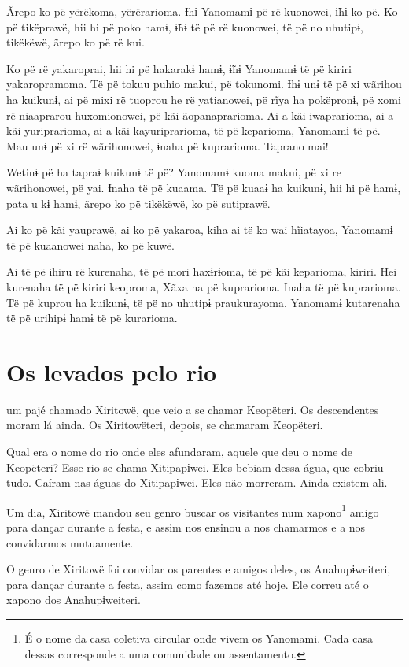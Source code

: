 Ãrepo ko pë yërëkoma, yërërarioma. Ɨhɨ Yanomamɨ pë rë kuonowei, ɨ̃hɨ ko
pë. Ko pë tikëprawë, hii hi pë poko hamɨ, ɨ̃hɨ të pë rë kuonowei, të pë
no uhutipɨ, tikëkëwë, ãrepo ko pë rë kui. 

Ko pë rë yakaroprai, hii hi pë hakarakɨ hamɨ, ɨ̃hɨ Yanomamɨ të pë kiriri
yakaropramoma. Të pë tokuu puhio makui, pë tokunomi. Ɨhɨ unɨ të pë xi
wãrihou ha kuikunɨ, ai pë mixi rë tuoprou he rë yatianowei, pë rĩya ha
pokëpronɨ, pë xomi rë niaaprarou huxomionowei, pë kãi ãopanaprarioma. Ai
a kãi iwaprarioma, ai a kãi yuriprarioma, ai a kãi kayuriprarioma, të pë
keparioma, Yanomamɨ të pë. Mau unɨ pë xi rë wãrihonowei, ɨnaha pë
kuprarioma. Taprano mai! 

Wetinɨ pë ha tapraɨ kuikunɨ të pë? Yanomamɨ kuoma makui, pë xi re
wãrihonowei, pë yai. Ɨnaha të pë kuaama. Të pë kuaaɨ ha kuikunɨ, hii hi
pë hamɨ, pata u kɨ hamɨ, ãrepo ko pë tikëkëwë, ko pë sutiprawë. 

Ai ko pë kãi yauprawë, ai ko pë yakaroa, kiha ai të ko wai hĩiatayoa,
Yanomamɨ të pë kuaanowei naha, ko pë kuwë. 

Ai të pë ihiru rë kurenaha, të pë mori haxɨrɨoma, të pë kãi keparioma,
kiriri. Hei kurenaha të pë kiriri keoproma, Xãxa na pë kuprarioma. Ɨnaha
të pë kuprarioma. Të pë kuprou ha kuikunɨ, të pë no uhutipɨ
praukurayoma. Yanomamɨ kutarenaha të pë urihipɨ hamɨ të pë kurarioma.

\chapter{Os levados pelo rio}

 um pajé chamado Xiritowë, que veio a se chamar Keopëteri. Os
descendentes moram lá ainda. Os Xiritowëteri, depois, se chamaram
Keopëteri. 

Qual era o nome do rio onde eles afundaram, aquele que deu o nome de
Keopëteri? Esse rio se chama Xitipapɨwei. Eles bebiam dessa água, que
cobriu tudo. Caíram nas águas do Xitipapɨwei. Eles não morreram. Ainda
existem ali. 

Um dia, Xiritowë mandou seu genro buscar os visitantes
num xapono\footnote{É o nome da casa coletiva circular onde vivem os Yanomami. Cada casa
dessas corresponde a uma comunidade ou assentamento.} amigo para dançar durante a festa, e assim
nos ensinou a nos chamarmos e a nos convidarmos mutuamente. 

O genro de Xiritowë foi convidar os parentes e amigos deles, os
Anahupɨweiteri, para dançar durante a festa, assim como fazemos até hoje.
Ele correu até o xapono dos Anahupɨweiteri. 

